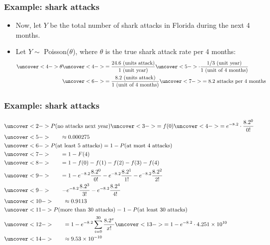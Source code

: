 \documentclass[handout]{beamer}\usepackage{graphicx, color}
\numberwithin{equation}{section}
\begin{document}
\begin{frame}
\frametitle{Example: shark attacks}
\begin{itemize}
\pause \item Now, let $Y$ be the total number of shark attacks in Florida during the next 4 months.
\pause \item Let $Y \sim $ Poisson($\theta$), where $\theta$ is the true shark attack rate per 4 months:
\begin{align*}
\uncover<4->{\theta} &\uncover<4->{= \frac{24.6 \text{ (units attack)}}{1 \text{ (unit year)}}} \uncover<5->{ \cdot \frac{1/3 \text{ (unit year)}}{1 \text{ (unit of 4 months)}}} \\
& \uncover<6->{= \frac{8.2 \text{ (units attack)}}{1 \text{ (unit of 4 months)}}} \uncover<7->{ = 8.2 \text{ attacks per 4 months}}
\end{align*}
\end{itemize}
\end{frame}

\begin{frame}
\frametitle{Example: shark attacks} \small
\begin{align*}
&\uncover<2->{P(\text{no attacks next year}) \uncover<3->{=f(0)} \uncover<4->{= e^{-8.2} \cdot \frac{8.2^0}{0!}}} \\
&\uncover<5->{ \qquad \approx 0.000275} \\
&\uncover<6->{P(\text{at least 5 attacks}) = 1 - P(\text{at most 4 attacks})} \\
&\uncover<7->{ \qquad =1 - F(4)} \\
&\uncover<8->{ \qquad =1 - f(0) - f(1) - f(2) - f(3) - f(4)} \\
&\uncover<9->{ \qquad =1 - e^{-8.2} \frac{8.2^0}{0!} - e^{-8.2} \frac{8.2^1}{1!} - e^{-8.2} \frac{8.2^2}{2!}} \\
&\uncover<9->{ \qquad - e^{-8.2} \frac{8.2^3}{3!} - e^{-8.2} \frac{8.2^4}{4!}} \\
&\uncover<10->{\qquad \approx 0.9113} \\
&\uncover<11->{P(\text{more than 30 attacks}) = 1 - P(\text{at least 30 attacks})} \\
&\uncover<12->{ \qquad= 1 - e^{-8.2} \sum_{i = 0}^{30} \frac{8.2^x}{x!}} \uncover<13->{= 1 - e^{-8.2} \cdot 4.251 \times 10^{10}} \\
&\uncover<14->{ \qquad \approx 9.53 \times 10^{-10}}
\end{align*}
\end{frame}
\end{document}
